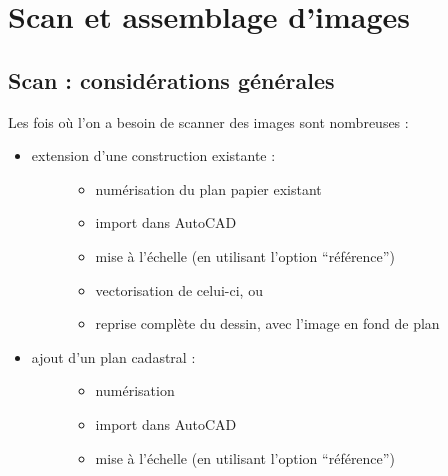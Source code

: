 \documentclass[a4paper,12pt,french]{sphinxmanual}
\begin{document}
\section{Scan et assemblage d'images}
\label{psd/scan+assemblage_psd+gimp+autopano::doc}\label{psd/scan+assemblage_psd+gimp+autopano:scan-et-assemblage-d-images}\label{psd/scan+assemblage_psd+gimp+autopano:scan-assemblage-images-psd-gimp}

\subsection{Scan : considérations générales}
\label{psd/scan+assemblage_psd+gimp+autopano:scan-considerations-generales}
Les fois où l'on a besoin de scanner des images sont nombreuses :
\begin{itemize}
\item {} \begin{description}
\item[{extension d'une construction existante :}] \leavevmode\begin{itemize}
\item {} 
numérisation du plan papier existant

\item {} 
import dans AutoCAD

\item {} 
mise à l'échelle (en utilisant l'option ``référence'')

\item {} 
vectorisation de celui-ci, ou

\item {} 
reprise complète du dessin, avec l'image en fond de plan

\end{itemize}

\end{description}

\item {} \begin{description}
\item[{ajout d'un plan cadastral :}] \leavevmode\begin{itemize}
\item {} 
numérisation

\item {} 
import dans AutoCAD

\item {} 
mise à l'échelle (en utilisant l'option ``référence'')

\end{itemize}


\end{description}
\end{itemize}
\end{document}

